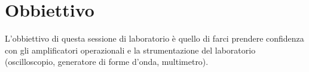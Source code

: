 \section*{Obbiettivo}

L'obbiettivo di questa sessione di laboratorio è quello di farci prendere confidenza con gli amplificatori operazionali e la strumentazione del laboratorio (oscilloscopio, generatore di forme d'onda, multimetro).

